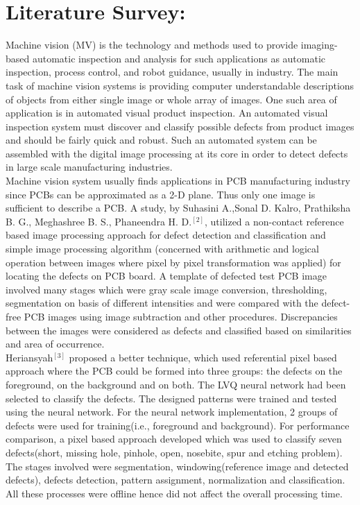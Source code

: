 \documentclass[12pt]{article}
\begin{document}
\section{Literature Survey:}
{\quad}Machine vision (MV) is the technology and methods used to provide imaging-based automatic inspection and analysis for such applications as automatic inspection, process control, and robot guidance, usually in industry. The main task of machine vision systems is providing computer understandable descriptions of objects from either single image or whole array of images. One such area of application  is in automated visual product inspection. An automated visual inspection system must discover and classify possible defects from product images and should be fairly quick and robust. Such an automated system can be assembled with the digital image processing at its core in order to detect defects in large scale manufacturing industries.\\

{\quad}Machine vision system usually finds applications in PCB manufacturing industry since PCBs can be approximated as a 2-D plane. Thus only one image is sufficient to describe a PCB. A study, by Suhasini A.,Sonal D. Kalro, Prathiksha B. G., Meghashree B. S., Phaneendra H. D.$^{[2]}$, utilized a non-contact reference based image processing approach for defect detection and classification and simple image processing algorithm (concerned with arithmetic and logical operation between images where pixel by pixel transformation was applied) for locating the defects on PCB board. A template of defected test PCB image involved many stages which were gray scale image conversion, thresholding, segmentation on basis of different  intensities and were compared with the defect-free PCB images using image subtraction and other procedures. Discrepancies between the images were considered as defects and classified based on similarities and area of occurrence.\\

{\quad}Heriansyah$^{[3]}$ proposed a better technique, which used referential pixel based approach where the PCB could be formed into three groups: the defects on the foreground, on the background and on both. The LVQ neural network had been selected to classify the defects. The designed patterns were trained and tested using the neural network. For the neural network implementation, 2 groups of defects were used for training(i.e., foreground and background). For performance comparison, a pixel  based approach developed which was used to classify seven defects(short, missing hole, pinhole, open, nosebite, spur and etching problem). The stages involved were segmentation, windowing(reference image and detected defects), defects detection, pattern assignment, normalization and classification. All these processes were offline hence did not affect the overall processing time.\\
\end{document}
